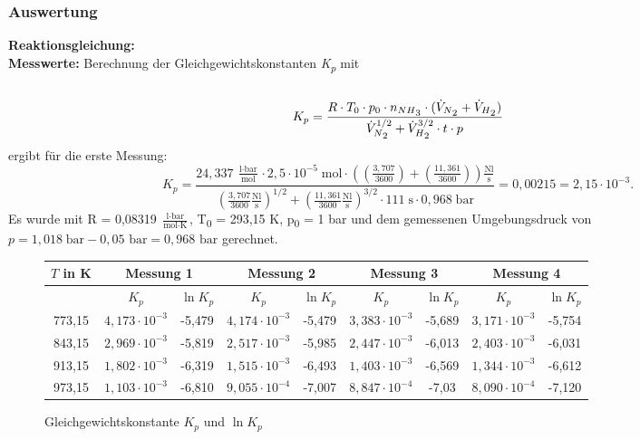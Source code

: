 \documentclass{scrartcl}
\begin{document}
\subsubsection{Auswertung}
\textbf{Reaktionsgleichung:}
 \\
\textbf{Messwerte:}
Berechnung der Gleichgewichtskonstanten \emph{K\textsubscript{\emph{p}}} mit\\ \\
\begin{equation}
K_p = \frac{ R \cdot T_0 \cdot p_0 \cdot n_{NH\textsubscript{3}} \cdot ( \dot{V}_{N\textsubscript{2}} + \dot{V}_{H\textsubscript{2}})}{\dot{V}^{1/2}_{N\textsubscript{2}} + \dot{V}^{3/2}_{H\textsubscript{2}} \cdot t \cdot p}
\end{equation}
ergibt für die erste Messung:
\begin{equation}
	K_p = \frac{24,337 \;\frac{\text{l} \cdot \text{bar}}{\text{mol}} \cdot 2,5 \cdot 10^{-5} \;\text{mol} \cdot ((\frac{3,707}{3600}) + (\frac{11,361}{3600}))\frac{\text{Nl}}{\text{s}}}{(\frac{3,707}{3600}\frac{\text{Nl}}{\text{s}})^{1/2} + (\frac{11,361}{3600}\frac{\text{Nl}}{\text{s}})^{3/2} \cdot 111 \;\text{s} \cdot 0,968 \;\text{bar}} = 0,00215 = 2,15 \cdot 10^{-3}.
\end{equation}
Es wurde mit R = 0,08319 $\frac{\text{l}\cdot \text{bar}}{\text{mol}\cdot \text{K}}$, T\textsubscript{0} = 293,15 K, p\textsubscript{0} = 1 bar und dem gemessenen Umgebungsdruck von $p = 1,018\; \text{bar} - 0,05 \text{ bar} = 0,968 \text{ bar}$ gerechnet.
\begin{figure}[h]
	\centering
	\caption{Gleichgewichtskonstante $K_p$ und $\ln{K_p}$}
	\begin{tabular}{c|c c|c c|c c|c c}
		$T$ in K & \multicolumn{2}{|c|}{Messung 1} & \multicolumn{2}{c|}{Messung 2} & \multicolumn{2}{c|}{Messung 3} & \multicolumn{2}{c}{Messung 4} \\ \hline \hline
		& $K_p$ & $\ln{K_p}$ & $K_p$ & $\ln{K_p}$ & $K_p$ & $\ln{K_p}$ & $K_p$ & $\ln{K_p}$ \\ \hline
		773,15 & $4,173\cdot 10^{-3}$ & -5,479 & $4,174\cdot 10^{-3}$ &-5,479 & $3,383\cdot 10^{-3}$ & -5,689 & $3,171\cdot 10^{-3}$ & -5,754 \\
		843,15 & $2,969\cdot 10^{-3}$ &-5,819 & $2,517\cdot 10^{-3}$ & -5,985 & $2,447\cdot 10^{-3}$ & -6,013 & $2,403\cdot 10^{-3}$ & -6,031 \\
		913,15 & $1,802\cdot 10^{-3}$ & -6,319 & $1,515\cdot 10^{-3}$ & -6,493 & $1,403\cdot 10^{-3}$ & -6,569 & $1,344\cdot 10^{-3}$ & -6,612 \\
		973,15 & $1,103\cdot 10^{-3}$ & -6,810 & $9,055\cdot 10^{-4}$ & -7,007 & $8,847\cdot 10^{-4}$ & -7,03 & $8,090\cdot 10^{-4}$ & -7,120
	\end{tabular}
\end{figure}
\end{document}
